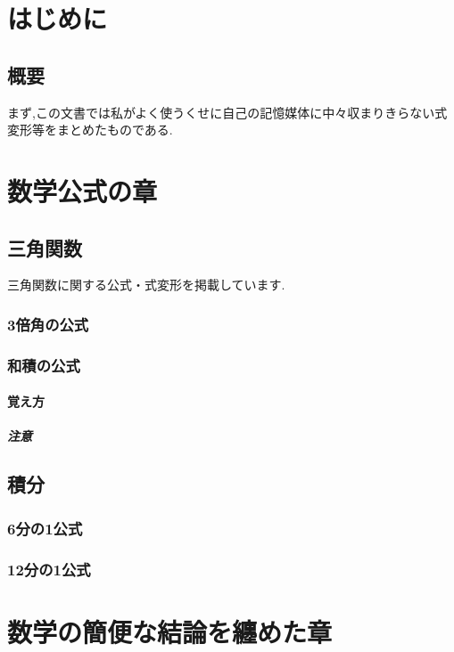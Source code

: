 \documentclass[]{jreport}
\begin{document}
\part{はじめに}
\chapter{概要}

まず,この文書では私がよく使うくせに自己の記憶媒体に中々収まりきらない式変形等をまとめたものである.

\part{数学公式の章}
\chapter{三角関数}

三角関数に関する公式・式変形を掲載しています.

\section{3倍角の公式}
\section{和積の公式}

\subsection{覚え方}

\subsubsection{注意}

\chapter{積分}

\section{6分の1公式}
\section{12分の1公式}

\part{数学の簡便な結論を纏めた章}
\end{document}
